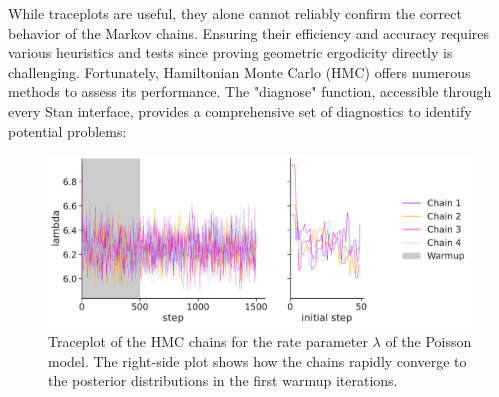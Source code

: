 While traceplots are useful, they alone cannot reliably confirm the correct behavior of the Markov chains. Ensuring
their efficiency and accuracy requires various heuristics and tests since proving geometric ergodicity directly is
challenging. Fortunately, Hamiltonian Monte Carlo (HMC) offers numerous methods to assess its performance. The
"diagnose" function, accessible through every Stan interface, provides a comprehensive set of diagnostics to identify potential problems:
\vfill
\begin{figure}[t]
    \centering
    \includegraphics[width=0.9\linewidth]{figures/ch2/poisson/convergence_plot_0.pdf}
    \caption{Traceplot of the HMC chains for the rate parameter $\lambda$ of the Poisson model. The right-side plot shows how the chains rapidly converge to the posterior distributions in the first warmup iterations.}
    \label{fig:pois_trace}
\end{figure}
\vfill
